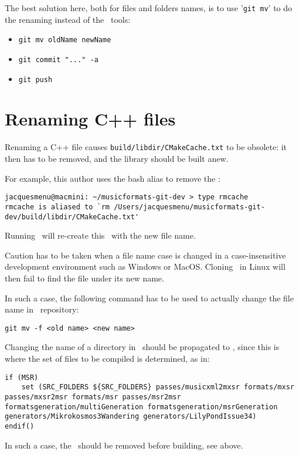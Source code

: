 The best solution here, both for files and folders names, is to use '{\tt git mv}' to do the renaming instead of the \OS\ tools:
\begin{itemize}
\item {\tt git mv oldName newName}
\item {\tt git commit "..." -a}
\item {\tt git push}
\end{itemize}


\section{Renaming C++ files}

Renaming a C++ file causes {\tt build/libdir/CMakeCache.txt} to be obsolete: it then has to be removed, and the library should be built anew.

For example, this author uses the  bash alias to remove the \cache:
\begin{lstlisting}[language=Terminal]
jacquesmenu@macmini: ~/musicformats-git-dev > type rmcache
rmcache is aliased to `rm /Users/jacquesmenu/musicformats-git-dev/build/libdir/CMakeCache.txt'
\end{lstlisting}

Running \make\ will re-create this \cache\ with the new file name.

Caution has to be taken when a file name case is changed in a case-insensitive development environment such as Windows or MacOS. Cloning \mf\ in Linux will then fail to find the file under its new name.

In such a case, the following  command has to be used to actually change the file name in \mf\ repository:
\begin{lstlisting}[language=Terminal]
git mv -f <old name> <new name>
\end{lstlisting}

Changing the name of a directory in \src\ should be propagated to , since this is where the set of files to be compiled is determined, as in:
\begin{lstlisting}[language=Terminal]
if (MSR)
	set (SRC_FOLDERS ${SRC_FOLDERS} passes/musicxml2mxsr formats/mxsr passes/mxsr2msr formats/msr passes/msr2msr formatsgeneration/multiGeneration formatsgeneration/msrGeneration generators/Mikrokosmos3Wandering generators/LilyPondIssue34)
endif()
\end{lstlisting}
In such a case, the \cache\ should be removed before building, see  above.


